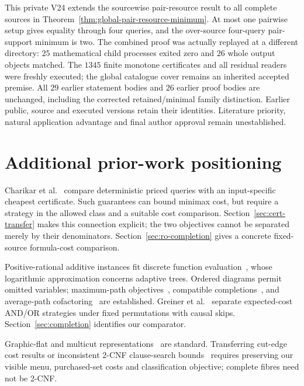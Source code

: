 \documentclass[pdflatex,sn-mathphys-num]{sn-jnl}
\theoremstyle{thmstyleone}
\theoremstyle{thmstylethree}
\theoremstyle{thmstyletwo}
\begin{document}
This private V24 extends the sourcewise pair-resource result to all
complete sources in Theorem~\ref{thm:global-pair-resource-minimum}.
At most one pairwise setup gives equality through four queries, and
the over-source four-query pair-support minimum is two. The combined
proof was actually replayed at a different directory: $25$ mathematical
child processes exited zero and $26$ whole output objects matched.
The $1345$ finite monotone certificates and all residual readers were
freshly executed; the global catalogue cover remains an inherited
accepted premise. All $29$ earlier statement bodies and $26$ earlier
proof bodies are unchanged, including the corrected retained/minimal
family distinction. Earlier public, source and executed versions retain
their identities. Literature priority, natural application advantage
and final author approval remain unestablished.




\section{Additional prior-work positioning}\label{app:additional-positioning}
Charikar et al.~\cite{charikar02} compare deterministic priced queries with an input-specific cheapest certificate. Such guarantees can bound minimax cost, but require a strategy in the allowed class and a suitable cost comparison. Section~\ref{sec:cert-transfer} makes this connection explicit; the two objectives cannot be separated merely by their denominators. Section~\ref{sec:ro-completion} gives a concrete fixed-source formula-cost comparison.

Positive-rational additive instances fit discrete function evaluation~\cite{cicalese14}, whose logarithmic approximation concerns adaptive trees. Ordered diagrams permit omitted variables; maximum-path objectives~\cite{ebendt06,ebendt05}, compatible completions~\cite{oliveira,sasao}, and average-path cofactoring~\cite{jiang} are established. Greiner et al.~\cite{greiner} separate expected-cost AND/OR strategies under fixed permutations with causal skips. Section~\ref{sec:completion} identifies our comparator.

Graphic-flat and multicut representations~\cite{berczi,hornakova} are standard. Transferring cut-edge cost results or inconsistent 2-CNF clause-search bounds~\cite{lovasz} requires preserving our visible menu, purchased-set costs and classification objective; complete fibres need not be 2-CNF.
\end{document}
